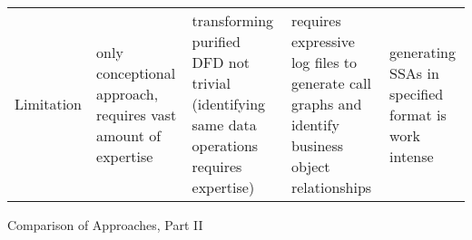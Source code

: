 {\begin{landscape}
\begin{threeparttable}[h!]
\begin{tabularx}{\linewidth}{XXXXX}
				Limitation & only conceptional approach, requires vast amount of expertise & transforming purified DFD not trivial (identifying same data operations requires expertise)& requires expressive log files to generate call graphs and identify business object relationships& generating SSAs in specified format is work intense  \\
				
			\end{tabularx}
			\caption{Comparison of Approaches, Part II}
			\label{tab:compareApproaches2}
			
			
			
		\end{threeparttable}
		
		
		
	\end{landscape}
	\clearpage%
}




























